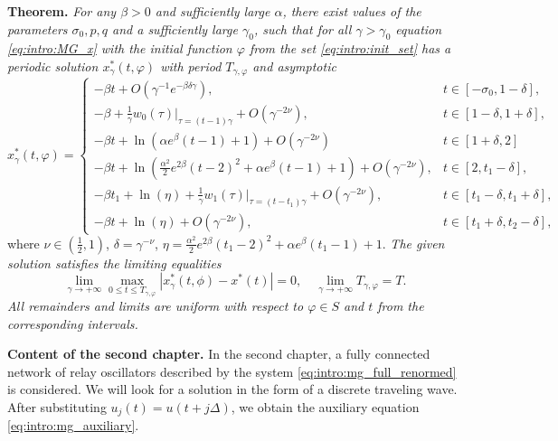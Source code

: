 \textbf{Theorem.} \textit{
	For any \(\beta > 0\) and sufficiently large \(\alpha\), there exist values of the parameters $\sigma_0, p, q$ and a sufficiently large $\gamma_0$, such that for all $\gamma > \gamma_0$ equation \eqref{eq:intro:MG_x} with the initial function $\varphi$ from the set \eqref{eq:intro:init_set} has a periodic solution $x^*_\gamma(t, \varphi)$ with period $T_{\gamma, \varphi}$ and asymptotic}
\footnotesize
\begin{equation}
	\label{eq:intro:sol_x*gamma}
	x^*_\gamma(t, \varphi)= 
	\begin{cases}
		- \beta t + O(\gamma^{-1} e^{-\beta \delta \gamma}), & t\in[-\sigma_0, 1 - \delta],\\
		-\beta + \frac{1}{\gamma} w_0(\tau)|_{\tau=(t - 1)\gamma} + O(\gamma^{-2\nu}), & t \in [1 - \delta,1 + \delta],\\
		- \beta t + \ln(\alpha e^{\beta}(t - 1) + 1) + O(\gamma^{-2\nu}) & t\in[1 + \delta, 2]\\
		- \beta t + \ln(\frac{\alpha^2}{2}e^{2 \beta}(t - 2)^2 + \alpha e^{\beta}(t - 1) + 1) + O(\gamma^{-2\nu}), & t \in [2, t_1 - \delta],\\
		- \beta t_1 + \ln(\eta)+\frac{1}{\gamma} w_1(\tau)|_{\tau=(t - t_1)\gamma} + O(\gamma^{-2\nu}), & t\in[t_1 - \delta, t_1  +\delta],\\
		- \beta t + \ln(\eta) + O(\gamma^{-2\nu}), & t \in [t_1 + \delta, t_2 - \delta],
	\end{cases}
\end{equation}
\normalsize
where $\nu \in (\frac{1}{2}, 1)$, $\delta = \gamma^{-\nu}$, $\eta=\frac{\alpha^2}{2}e^{2\beta}(t_1 - 2)^2 + \alpha e^{\beta}(t_1 - 1) + 1$.
%
\textit{The given solution satisfies the limiting equalities}
%
\begin{equation}
	\label{eq:intro:lim_x*}
	\lim_{\gamma\to+\infty}\max_{0\leqslant t\leqslant T_{\gamma, \varphi}}|x_{\gamma}^*(t, \phi)-x^*(t)|=0,\quad \lim_{\gamma\to+\infty}T_{\gamma, \varphi} = T.
\end{equation}
\textit{All remainders and limits are uniform with respect to $\varphi \in S$ and $t$ from the corresponding intervals.}

\textbf{Content of the second chapter.} In the second chapter, a fully connected network of relay oscillators described by the system \eqref{eq:intro:mg_full_renormed} is considered. We will look for a solution in the form of a discrete traveling wave. After substituting $u_j(t) = u(t + j\Delta)$, we obtain the auxiliary equation \eqref{eq:intro:mg_auxiliary}.

